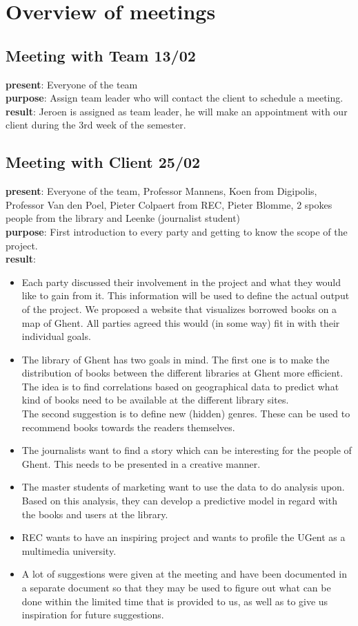 \chapter{Overview of meetings}

\section{Meeting with Team 13/02}
{\bf present}: Everyone of the team\\
{\bf purpose}: Assign team leader who will contact the client to schedule a meeting.\\
{\bf result}: Jeroen is assigned as team leader, he will make an appointment with our client during the 3rd week of the semester.

\section{Meeting with Client 25/02}

{\bf present}: Everyone of the team, Professor Mannens, Koen from Digipolis, Professor Van den Poel, Pieter Colpaert from REC, Pieter Blomme, 2 spokes people from the library and Leenke (journalist student)\\
{\bf purpose}: First introduction to every party and getting to know the scope of the project.\\
{\bf result}:
\begin{itemize}
\item Each party discussed their involvement in the project and what they would like to gain from it. This information will be used to define the actual output of the project. We proposed a website that visualizes borrowed books on a map of Ghent. All parties agreed this would (in some way) fit in with their individual goals.
\item The library of Ghent has two goals in mind. The first one is to make the distribution of books between the different libraries at Ghent more efficient. The idea is to find correlations based on geographical data to predict what kind of books need to be available at the different library sites.\\ The second suggestion is to define new (hidden) genres. These can be used to recommend books towards the readers themselves.
\item The journalists want to find a story which can be interesting for the people of Ghent. This needs to be presented in a creative manner.
\item The master students of marketing want to use the data to do analysis upon. Based on this analysis, they can develop a predictive model in regard with the books and users at the library.
\item REC wants to have an inspiring project and wants to profile the UGent as a multimedia university.
\item A lot of suggestions were given at the meeting and have been documented in a separate document so that they may be used to figure out what can be done within the limited time that is provided to us, as well as to give us inspiration for future suggestions.
\end{itemize}
